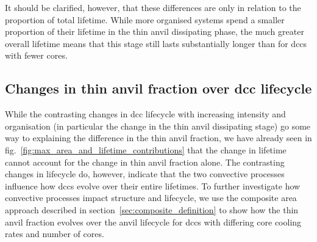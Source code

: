 It should be clarified, however, that these differences are only in relation to the proportion of total lifetime.
While more organised systems spend a smaller proportion of their lifetime in the thin anvil dissipating phase, the much greater overall lifetime means that this stage still lasts substantially longer than for \acrfull{dcc}s with fewer cores.





\subsection{Changes in thin anvil fraction over \acrshort{dcc} lifecycle} \label{sec:composite_results}

While the contrasting changes in \acrshort{dcc} lifecycle with increasing intensity and organisation (in particular the change in the thin anvil dissipating stage) go some way to explaining the difference in the thin anvil fraction, we have already seen in fig.~\ref{fig:max_area_and_lifetime_contributions} that the change in lifetime cannot account for the change in thin anvil fraction alone.
The contrasting changes in lifecycle do, however, indicate that the two convective processes influence how \acrshort{dcc}s evolve over their entire lifetimes.
To further investigate how convective processes impact structure and lifecycle, we use the composite area approach described in section~\ref{sec:composite_definition} to show how the thin anvil fraction evolves over the anvil lifecycle for \acrshort{dcc}s with differing core cooling rates and number of cores.


